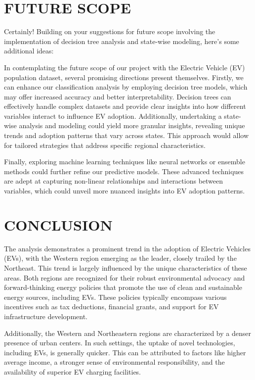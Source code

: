 \documentclass[
  letterpaper,
  DIV=11,
  numbers=noendperiod]{scrartcl}
\begin{document}
\hypertarget{future-scope}{%
\section{FUTURE SCOPE}\label{future-scope}}

Certainly! Building on your suggestions for future scope involving the
implementation of decision tree analysis and state-wise modeling, here's
some additional ideas:

In contemplating the future scope of our project with the Electric
Vehicle (EV) population dataset, several promising directions present
themselves. Firstly, we can enhance our classification analysis by
employing decision tree models, which may offer increased accuracy and
better interpretability. Decision trees can effectively handle complex
datasets and provide clear insights into how different variables
interact to influence EV adoption. Additionally, undertaking a
state-wise analysis and modeling could yield more granular insights,
revealing unique trends and adoption patterns that vary across states.
This approach would allow for tailored strategies that address specific
regional characteristics.

Finally, exploring machine learning techniques like neural networks or
ensemble methods could further refine our predictive models. These
advanced techniques are adept at capturing non-linear relationships and
interactions between variables, which could unveil more nuanced insights
into EV adoption patterns.

\hypertarget{conclusion}{%
\section{CONCLUSION}\label{conclusion}}

The analysis demonstrates a prominent trend in the adoption of Electric
Vehicles (EVs), with the Western region emerging as the leader, closely
trailed by the Northeast. This trend is largely influenced by the unique
characteristics of these areas. Both regions are recognized for their
robust environmental advocacy and forward-thinking energy policies that
promote the use of clean and sustainable energy sources, including EVs.
These policies typically encompass various incentives such as tax
deductions, financial grants, and support for EV infrastructure
development.

Additionally, the Western and Northeastern regions are characterized by
a denser presence of urban centers. In such settings, the uptake of
novel technologies, including EVs, is generally quicker. This can be
attributed to factors like higher average income, a stronger sense of
environmental responsibility, and the availability of superior EV
charging facilities.
\end{document}
